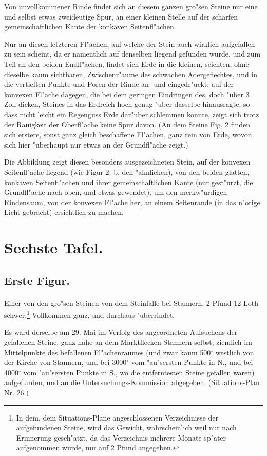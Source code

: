\documentclass[a4paper, 11pt, oneside, german]{article}
\begin{document}
Von unvollkommener Rinde findet sich an diesem ganzen gro"sen Steine nur eine und selbst etwas zweideutige Spur, an einer kleinen Stelle auf der scharfen gemeinschaftlichen Kante der konkaven Seitenfl"achen.

Nur an diesen letzteren Fl"achen, auf welche der Stein auch wirklich aufgefallen zu sein scheint, da er namentlich auf denselben liegend gefunden wurde, und zum Teil an den beiden Endfl"achen, findet sich Erde in die kleinen, seichten, ohne dieselbe kaum sichtbaren, Zwischenr"aume des schwachen Adergeflechtes, und in die vertieften Punkte und Poren der Rinde an- und eingedr"uckt; auf der konvexen Fl"ache dagegen, die bei dem geringen Eindringen des, doch "uber 3 Zoll dicken, Steines in das Erdreich hoch genug "uber dasselbe hinausragte, so dass nicht leicht ein Regenguss Erde dar"uber schlemmen konnte, zeigt sich trotz der Rauigkeit der Oberfl"ache keine Spur davon. (An dem Steine Fig. 2 finden sich erstere, sonst ganz gleich beschaffene Fl"achen, ganz rein von Erde, wovon sich hier "uberhaupt nur etwas an der Grundfl"ache zeigt.)

Die Abbildung zeigt diesen besonders ausgezeichneten Stein, auf der konvexen Seitenfl"ache liegend (wie Figur 2. b. den "ahnlichen), von den beiden glatten, konkaven Seitenfl"achen und ihrer gemeinschaftlichen Kante (nur gest"urzt, die Grundfl"ache nach oben, und etwas gewendet), um den merkw"urdigen Rindensaum, von der konvexen Fl"ache her, an einem Seitenrande (in das n"otige Licht gebracht) ersichtlich zu machen.
\clearpage
\section{Sechste Tafel.}
\subsection{Erste Figur.}
\paragraph{}
Einer von den gro"sen Steinen von dem Steinfalle bei Stannern, 2 Pfund 12 Loth schwer.\footnote{In dem, dem Situations-Plane angeschlossenen Verzeichnisse der aufgefundenen Steine, wird das Gewicht, wahrscheinlich weil nur nach Erinnerung gesch"atzt, da das Verzeichnis mehrere Monate sp"ater aufgenommen wurde, nur auf 2 Pfund angegeben.} Vollkommen ganz, und durchaus "uberrindet.

Es ward derselbe am 29. Mai im Verfolg des angeordneten Aufsuchens der gefallenen Steine, ganz nahe an dem Marktflecken Stannern selbst, ziemlich im Mittelpunkte des befallenen Fl"achenraumes (und zwar kaum 500$^{\circ}$ westlich von der Kirche von Stannern, und bei 3000$^{\circ}$ vom "au"sersten Punkte in N., und bei 4000$^{\circ}$ vom "au"sersten Punkte in S., wo die entferntesten Steine gefallen waren) aufgefunden, und an die Untersuchungs-Kommission abgegeben. (Situations-Plan Nr. 26.)
\end{document}

